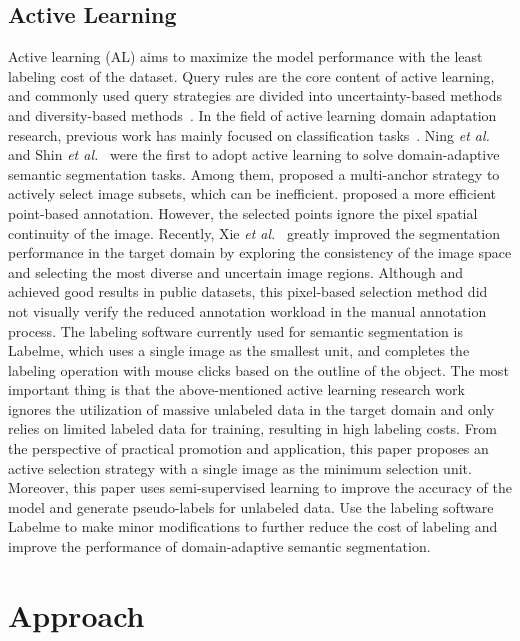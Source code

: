 \documentclass[journal]{IEEEtran}
\newcommand{\etal}{\textit{et al.}}
\begin{document}
\subsection{Active Learning}
Active learning (AL) aims to maximize the model performance with the least labeling cost of the dataset. Query rules are the core content of active learning, and  commonly used query strategies are divided into uncertainty-based methods~\cite{du2017robust} and diversity-based methods~\cite{gal2017deep}. In the field of active learning domain adaptation research, previous work has mainly focused on classification tasks~\cite{fu2021transferable, prabhu2021active}. Ning \etal~\cite{ning2021multi} and Shin \etal~\cite{shin2021labor} were the first to adopt active learning to solve domain-adaptive semantic segmentation tasks. Among them, \cite{ning2021multi} proposed a multi-anchor strategy to actively select image subsets, which can be inefficient. \cite{shin2021labor} proposed a more efficient point-based annotation. However, the selected points ignore the pixel spatial continuity of the image. Recently, Xie \etal~\cite{xie2022towards} greatly improved the segmentation performance in the target domain by exploring the consistency of the image space and selecting the most diverse and uncertain image regions. Although \cite{shin2021labor} and \cite{xie2022towards} achieved good results in public datasets, this pixel-based selection method did not visually verify the reduced annotation workload in the manual annotation process. The labeling software currently used for semantic segmentation is Labelme, which uses a single image as the smallest unit, and completes the labeling operation with mouse clicks based on the outline of the object. The most important thing is that the above-mentioned active learning research work ignores the utilization of massive unlabeled data in the target domain and only relies on limited labeled data for training, resulting in high labeling costs. From the perspective of practical promotion and application, this paper proposes an active selection strategy with a single image as the minimum selection unit. Moreover, this paper uses semi-supervised learning to improve the accuracy of the model and generate pseudo-labels for unlabeled data. Use the labeling software Labelme to make minor modifications to further reduce the cost of labeling and improve the performance of domain-adaptive semantic segmentation.


\section{Approach}
\label{sec:method}
\end{document}
